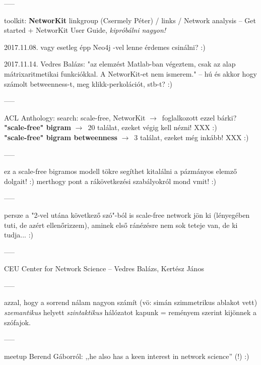 \documentclass{llncs}
\newcommand{\nyil}{$\rightarrow$\ }
\newcommand{\embf}[1]{\textbf{#1}}
\begin{document}
-----

toolkit: \embf{NetworKit}
linkgroup (Csermely Péter) / links / Network analysis
-- Get started + NetworKit User Guide, \emph{kipróbálni nagyon!}

2017.11.08. vagy esetleg épp Neo4j -vel lenne érdemes csinálni? :)

2017.11.14. Vedres Balázs: "az elemzést Matlab-ban végeztem,
csak az alap mátrixaritmetikai funkciókkal. A NetworKit-et nem ismerem."
-- hú és akkor hogy számolt betweenness-t, meg klikk-perkolációt, stb-t? :)


-----

ACL Anthology: search: scale-free, NetworKit
\nyil foglalkozott ezzel bárki?\\
\embf{"scale-free" bigram} \nyil 20 találat, ezeket végig kell nézni! XXX :)\\
\embf{"scale-free" bigram betweenness} \nyil 3 találat, ezeket még inkább! XXX :)

-----

ez a scale-free bigramos modell tökre segíthet kitalálni a pázmányos
elemző dolgait! :) merthogy pont a rákövetkezési szabályokról mond vmit! :)

-----

persze a "2-vel utána következő szó"-ból is scale-free network jön ki
(lényegében tuti, de azért ellenőrizzem),
aminek első ránézésre nem sok teteje van, de ki tudja... :)

-----

CEU Center for Network Science -- Vedres Balázs, Kertész János

-----

azzal, hogy a sorrend nálam nagyon számít
(vö: \cite{kovacs2012magyar} simán szimmetrikus ablakot vett)
\emph{szemantikus} helyett \emph{szintaktikus} hálózatot kapunk
= reményem szerint kijönnek a szófajok.

-----

meetup Berend Gáborról:
,,he also has a keen interest in network science'' (!) :)





%


\end{document}
